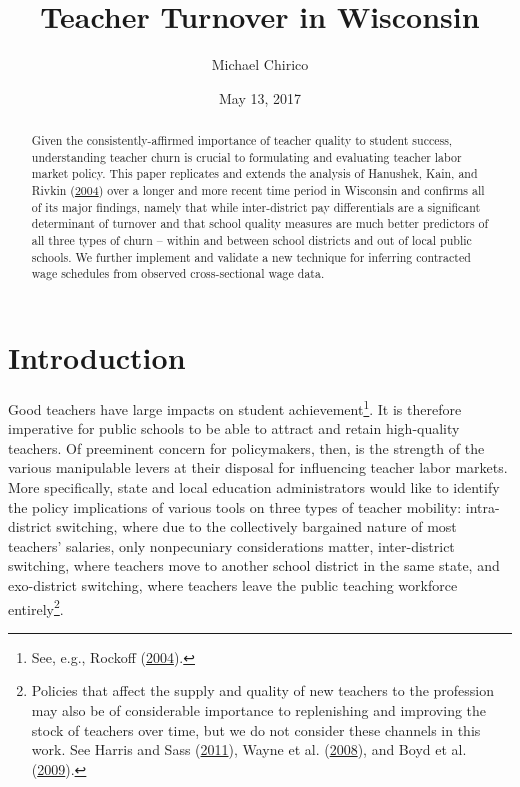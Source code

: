 \documentclass[12pt,]{article}
\title{Teacher Turnover in Wisconsin}
\author{Michael Chirico}
\date{May 13, 2017}
\let\rmarkdownfootnote\footnote%
\def\footnote{\protect\rmarkdownfootnote}
\newcommand{\TAG}[1]{}
\begin{document}
\maketitle
\begin{abstract}
Given the consistently-affirmed importance of teacher quality to student
success, understanding teacher churn is crucial to formulating and
evaluating teacher labor market policy. This paper replicates and
extends the analysis of Hanushek, Kain, and Rivkin
(\protect\hyperlink{ref-hanushek}{2004}) over a longer and more recent
time period in Wisconsin and confirms all of its major findings, namely
that while inter-district pay differentials are a significant
determinant of turnover and that school quality measures are much better
predictors of all three types of churn -- within and between school
districts and out of local public schools. We further implement and
validate a new technique for inferring contracted wage schedules from
observed cross-sectional wage data.
\end{abstract}

\section{Introduction}\label{introduction}

\TAG{BEGIN_INTRO}

Good teachers have large impacts on student achievement\footnote{See,
  e.g., Rockoff (\protect\hyperlink{ref-rockoff}{2004}).}. It is
therefore imperative for public schools to be able to attract and retain
high-quality teachers. Of preeminent concern for policymakers, then, is
the strength of the various manipulable levers at their disposal for
influencing teacher labor markets. More specifically, state and local
education administrators would like to identify the policy implications
of various tools on three types of teacher mobility: intra-district
switching, where due to the collectively bargained nature of most
teachers' salaries, only nonpecuniary considerations matter,
inter-district switching, where teachers move to another school district
in the same state, and exo-district switching, where teachers leave the
public teaching workforce entirely\footnote{Policies that affect the
  supply and quality of new teachers to the profession may also be of
  considerable importance to replenishing and improving the stock of
  teachers over time, but we do not consider these channels in this
  work. See Harris and Sass (\protect\hyperlink{ref-harris}{2011}),
  Wayne et al. (\protect\hyperlink{ref-wayne}{2008}), and Boyd et al.
  (\protect\hyperlink{ref-boyd2009}{2009}).}.
\end{document}

